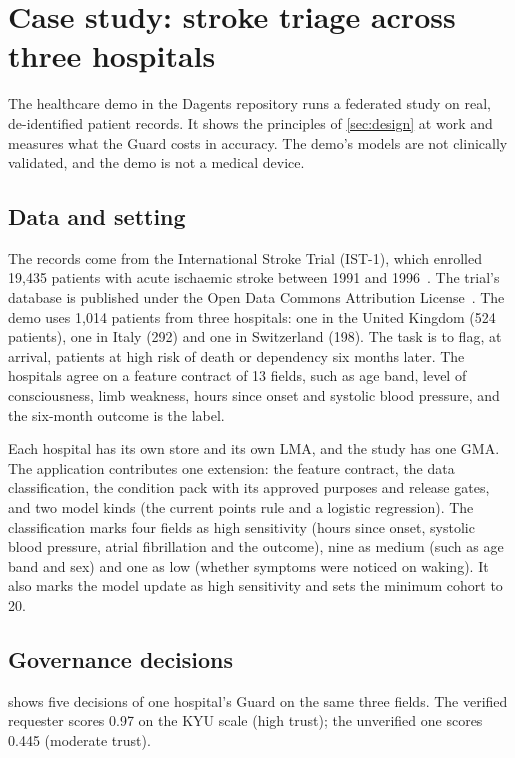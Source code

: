 \section{Case study: stroke triage across three hospitals}
\label{sec:case-study}

The healthcare demo in the Dagents repository runs a federated study on real,
de-identified patient records. It shows the principles of \cref{sec:design} at
work and measures what the Guard costs in accuracy. The demo's models are not
clinically validated, and the demo is not a medical device.

\subsection{Data and setting}

The records come from the International Stroke Trial (IST-1), which enrolled
19,435 patients with acute ischaemic stroke between 1991 and
1996~\citep{ist1997lancet,sandercock2011ist}. The trial's database is published
under the Open Data Commons Attribution License~\citep{sandercock2011istdata}.
The demo uses 1,014 patients from three hospitals: one in the United Kingdom
(524 patients), one in Italy (292) and one in Switzerland (198). The task is to
flag, at arrival, patients at high risk of death or dependency six months
later. The hospitals agree on a feature contract of 13 fields, such as age band,
level of consciousness, limb weakness, hours since onset and systolic blood
pressure, and the six-month outcome is the label.

Each hospital has its own store and its own LMA, and the study has one GMA. The
application contributes one extension: the feature contract, the data
classification, the condition pack with its approved purposes and release
gates, and two model kinds (the current points rule and a logistic regression).
The classification marks four fields as high sensitivity (hours since onset,
systolic blood pressure, atrial fibrillation and the outcome), nine as medium
(such as age band and sex) and one as low (whether symptoms were noticed on
waking). It also marks the model update as high sensitivity and sets the
minimum cohort to 20.

\subsection{Governance decisions}

 shows five decisions of one hospital's Guard on the same three
fields. The verified requester scores 0.97 on the KYU scale (high trust); the
unverified one scores 0.445 (moderate trust).

